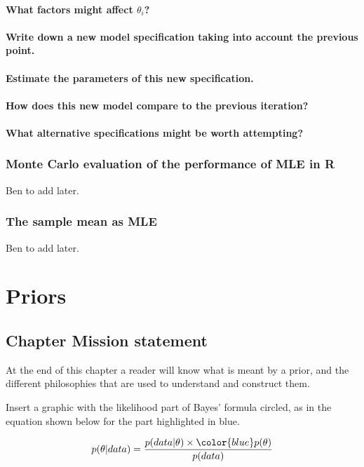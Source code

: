 \documentclass[11pt,fullpage]{book}
\begin{document}
\subsubsection{What factors might affect $\theta_i$?}
\subsubsection{Write down a new model specification taking into account the previous point.}
\subsubsection{Estimate the parameters of this new specification.}
\subsubsection{How does this new model compare to the previous iteration?}
\subsubsection{What alternative specifications might be worth attempting?}

\subsection{Monte Carlo evaluation of the performance of MLE in R}
Ben to add later.

\subsection{The sample mean as MLE}
Ben to add later.

\chapter{Priors}\label{chap:Prior}
\section{Chapter Mission statement}
At the end of this chapter a reader will know what is meant by a prior, and the different philosophies that are used to understand and construct them. 

Insert a graphic with the likelihood part of Bayes' formula circled, as in the equation shown below for the part highlighted in blue.

\begin{equation}
p(\theta|data) = \frac{p(data|\theta)\times {\color{blue}p(\theta)}}{p(data)}
\end{equation}\label{eq:Prior_BayesHighlighted}
\end{document}
